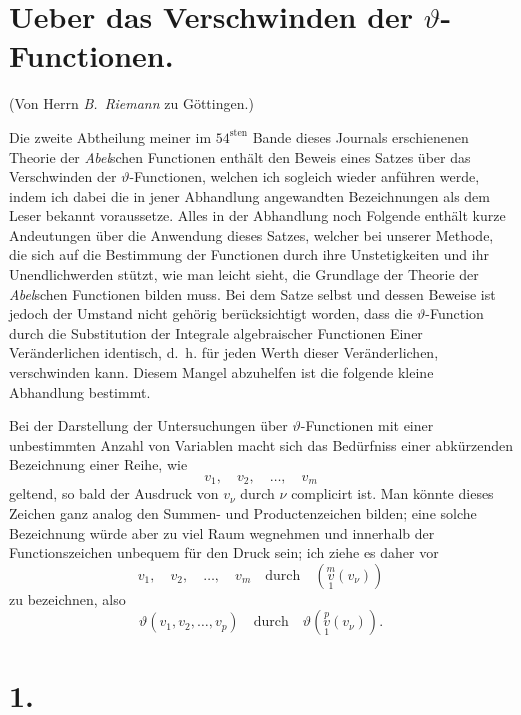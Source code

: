 \documentclass{article}
\begin{document}
\section*{Ueber das Verschwinden der $\vartheta$-Functionen.}

(Von Herrn \emph{B.~Riemann} zu Göttingen.)

Die zweite Abtheilung meiner im $54^{\text{sten}}$ Bande dieses Journals erschienenen Theorie der \emph{Abel}schen Functionen enthält den Beweis eines Satzes über das Verschwinden der $\vartheta$-Functionen, welchen ich sogleich wieder anführen werde, indem ich dabei die in jener Abhandlung angewandten Bezeichnungen als dem Leser bekannt voraussetze. Alles in der Abhandlung noch Folgende enthält kurze Andeutungen über die Anwendung dieses Satzes, welcher bei unserer Methode, die sich auf die Bestimmung der Functionen durch ihre Unstetigkeiten und ihr Unendlichwerden stützt, wie man leicht sieht, die Grundlage der Theorie der \emph{Abel}schen Functionen bilden muss. Bei dem Satze selbst und dessen Beweise ist jedoch der Umstand nicht gehörig berücksichtigt worden, dass die $\vartheta$-Function durch die Substitution der Integrale algebraischer Functionen Einer Veränderlichen identisch, d.~h. für jeden Werth dieser Veränderlichen, verschwinden kann. Diesem Mangel abzuhelfen ist die folgende kleine Abhandlung bestimmt.

Bei der Darstellung der Untersuchungen über $\vartheta$-Functionen mit einer unbestimmten Anzahl von Variablen macht sich das Bedürfniss einer abkürzenden Bezeichnung einer Reihe, wie
\[
v_1,\quad v_2,\quad \dots,\quad v_m
\]
geltend, so bald der Ausdruck von $v_\nu$ durch $\nu$ complicirt ist. Man könnte dieses Zeichen ganz analog den Summen- und Productenzeichen bilden; eine solche Bezeichnung würde aber zu viel Raum wegnehmen und innerhalb der Functionszeichen unbequem für den Druck sein; ich ziehe es daher vor
\[
v_1,\quad v_2,\quad \dots,\quad v_m \quad\text{durch}\quad \left(\overset{m}{\underset{1}{v}}(v_\nu)\right)
\]
zu bezeichnen, also
\[
\vartheta(v_1, v_2, \dots, v_p) \quad\text{durch}\quad \vartheta\left(\overset{p}{\underset{1}{v}}(v_\nu)\right).
\]

\section*{1.}
\end{document}
